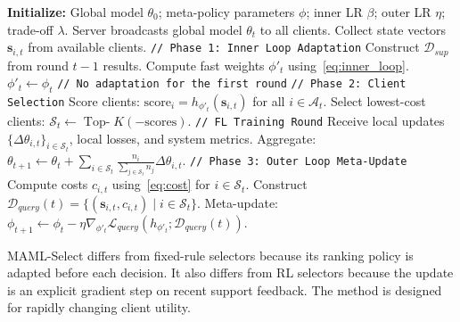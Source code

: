 \documentclass[journal]{IEEEtran}
\newcommand{\revision}[1]{#1}
\begin{document}
\begin{algorithm}[!t]
	\vspace{0.5mm}
	\caption{\small MAML-Select Algorithm}
	\label{alg:maml_select}
	\begin{algorithmic}[1]
		\scriptsize
		\State \textbf{Initialize:} Global model $\theta_0$; meta-policy parameters $\phi$; inner LR $\beta$; outer LR $\eta$; trade-off $\lambda$.
		\State Server broadcasts global model $\theta_t$ to all clients.
		\State Collect state vectors $\bm{s}_{i,t}$ from available clients.
		\State \texttt{// Phase 1: Inner Loop Adaptation}
		\State Construct $\mathcal{D}_{sup}$ from round $t-1$ results.
			\State \revision{Compute fast weights $\phi'_t$ using~\eqref{eq:inner_loop}.}
		\Else
		\State $\phi'_t \leftarrow \phi_t$ \quad \texttt{// No adaptation for the first round}
		\EndIf
		\State \texttt{// Phase 2: Client Selection}
			\State \revision{Score clients: $\text{score}_i = h_{\phi'_t}(\bm{s}_{i,t})$ for all $i \in \mathcal{A}_t$.}
			\State \revision{Select lowest-cost clients: $\mathcal{S}_t \leftarrow \operatorname{Top-}K(-\text{scores})$.}
			\State \texttt{// FL Training Round}
				\State \revision{Receive local updates $\{\Delta\theta_{i,t}\}_{i \in \mathcal{S}_t}$, local losses, and system metrics.}
			\State \revision{Aggregate: $\theta_{t+1} \leftarrow \theta_t + \sum_{i \in \mathcal{S}_t} \frac{n_i}{\sum_{j \in \mathcal{S}_t}n_j}\Delta\theta_{i,t}$.}
			\State \texttt{// Phase 3: Outer Loop Meta-Update}
			\State Compute costs $c_{i,t}$ using~\eqref{eq:cost} for $i \in \revision{\mathcal{S}_t}$.
			\State Construct $\mathcal{D}_{query}(t) = \{(\bm{s}_{i,t}, c_{i,t}) \mid i \in \revision{\mathcal{S}_t}\}$.
				\State \revision{Meta-update: $\phi_{t+1} \leftarrow \phi_t - \eta \nabla_{\phi'_t} \mathcal{L}_{query}(h_{\phi'_t};\mathcal{D}_{query}(t))$.}
		\EndFor
	\end{algorithmic}
\end{algorithm}

\revision{MAML-Select differs from fixed-rule selectors because its ranking policy is adapted before each decision. It also differs from RL selectors because the update is an explicit gradient step on recent support feedback. The method is designed for rapidly changing client utility.}
\end{document}
